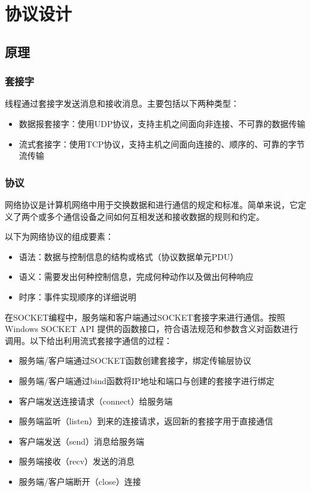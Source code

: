 \documentclass[UTF8,a4paper,10pt]{ctexart}
\begin{document}
\section{协议设计}

\subsection{原理}


\subsubsection{套接字}

线程通过套接字发送消息和接收消息。主要包括以下两种类型：
\begin{itemize}
\item 数据报套接字：使用UDP协议，支持主机之间面向非连接、不可靠的数据传输
\item 流式套接字：使用TCP协议，支持主机之间面向连接的、顺序的、可靠的字节流传输
\end{itemize}

\subsubsection{协议}

网络协议是计算机网络中用于交换数据和进行通信的规定和标准。简单来说，它定义了两个或多个通信设备之间如何互相发送和接收数据的规则和约定。\par
以下为网络协议的组成要素：
\begin{itemize}
\item 语法：数据与控制信息的结构或格式（协议数据单元PDU）
\item 语义：需要发出何种控制信息，完成何种动作以及做出何种响应
\item 时序：事件实现顺序的详细说明
\end{itemize}

在SOCKET编程中，服务端和客户端通过SOCKET套接字来进行通信。按照Windows SOCKET API 提供的函数接口，符合语法规范和参数含义对函数进行调用。以下给出利用流式套接字通信的过程：
\begin{itemize}
\item 服务端/客户端通过SOCKET函数创建套接字，绑定传输层协议
\item 服务端/客户端通过bind函数将IP地址和端口与创建的套接字进行绑定
\item 客户端发送连接请求（connect）给服务端
\item 服务端监听（listen）到来的连接请求，返回新的套接字用于直接通信
\item 客户端发送（send）消息给服务端
\item 服务端接收（recv）发送的消息
\item 服务端/客户端断开（close）连接
\end{itemize}
\end{document}
